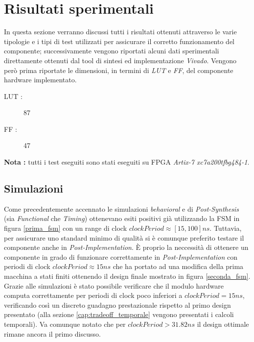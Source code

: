 \documentclass[11pt,a4paper]{article}
\begin{document}
    \section{Risultati sperimentali}
        In questa sezione verranno discussi tutti i risultati ottenuti attraverso le varie tipologie e i tipi di test utilizzati per assicurare il corretto funzionamento del componente; successivamente vengono riportati alcuni dati sperimentali direttamente ottenuti dal tool di sintesi ed implementazione \textit{Vivado}.
        Vengono però prima riportate le dimensioni, in termini di \textit{LUT} e \textit{FF}, del componente hardware implementato.
        \begin{description}
            \item[LUT : ] 87
            \item[FF : ] 47 
        \end{description}
        \textbf{Nota :} tutti i test eseguiti sono stati eseguiti su FPGA \textit{Artix-7 xc7a200tfbg484-1}.
        \subsection{Simulazioni}
            Come precedentemente accennato le simulazioni \textit{behavioral} e di \textit{Post-Synthesis} (sia \textit{Functional} che \textit{Timing}) ottenevano esiti positivi già utilizzando la FSM in figura \ref{prima_fsm} con un range di clock $clockPeriod \approx [15,100] ns$.
            Tuttavia, per assicurare uno standard minimo di qualità si è comunque preferito testare il componente anche in \textit{Post-Implementation}.
            È proprio la neccessità di ottenere un componente in grado di funzionare correttamente in  \textit{Post-Implementation} con periodi di clock $clockPeriod \approx 15 ns$ che ha portato ad una modifica della prima macchina a stati finiti ottenendo il design finale mostrato in figura \ref{seconda_fsm}.\\
            Grazie alle simulazioni è stato possibile verificare che il modulo hardware computa correttamente per periodi di clock poco inferiori a $clockPeriod = 15ns$, verificando così un discreto guadagno prestazionale rispetto al primo design presentato (alla sezione \ref{cap:tradeoff_temporale} vengono presentati i calcoli temporali).
            Va comunque notato che per $clockPeriod > 31.82ns$ il design ottimale rimane ancora il primo discusso.
\end{document}
